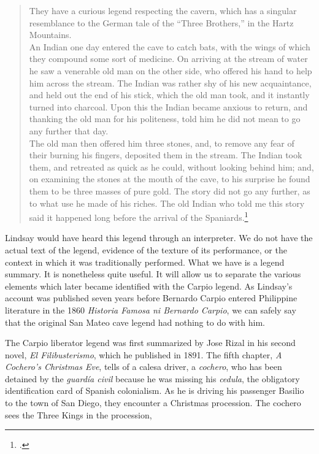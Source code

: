 \begin{quote}
They have a curious legend respecting the cavern, which has a singular resemblance to the German tale of the \enquote{Three Brothers,} in the Hartz Mountains.\\
An Indian one day entered the cave to catch bats, with the wings of which they compound some sort of medicine. On arriving at the stream of water he saw a venerable old man on the other side, who offered his hand to help him across the stream. The Indian was rather shy of his new acquaintance, and held out the end of his stick, which the old man took, and it instantly turned into charcoal. Upon this the Indian became anxious to return, and thanking the old man for his politeness, told him he did not mean to go any further that day.\\
The old man then offered him three stones, and, to remove any fear of their burning his fingers, deposited them in the stream. The Indian took them, and retreated as quick as he could, without looking behind him; and, on examining the stones at the mouth of the cave, to his surprise he found them to be three masses of pure gold. The story did not go any further, as to what use he made of his riches. The old Indian who told me this story said it happened long before the arrival of the Spaniards.\footcite[353-4]{Lindsay1854}	 
\end{quote}

Lindsay would have heard this legend through an interpreter. We do not have the actual text of the legend, evidence of the texture of its performance, or the context in which it was traditionally performed. What we have is a legend summary. It is nonetheless quite useful. It will allow us to separate the various elements which later became identified with the Carpio legend. As Lindsay's account was published seven years before Bernardo Carpio entered Philippine literature in the 1860 \textit{Historia Famosa ni Bernardo Carpio}, we can safely say that the original San Mateo cave legend had nothing to do with him.

The Carpio liberator legend was first summarized by Jose Rizal in his second novel, \textit{El Filibusterismo}, which he published in 1891. The fifth chapter, \textit{A Cochero's Christmas Eve}, tells of a calesa driver, a \textit{cochero}, who has been detained by the \textit{guard\'ia civil} because he was missing his \textit{cedula}, the obligatory identification card of Spanish colonialism. As he is driving his passenger Basilio to the town of San Diego, they encounter a Christmas procession. The cochero sees the Three Kings in the procession,

